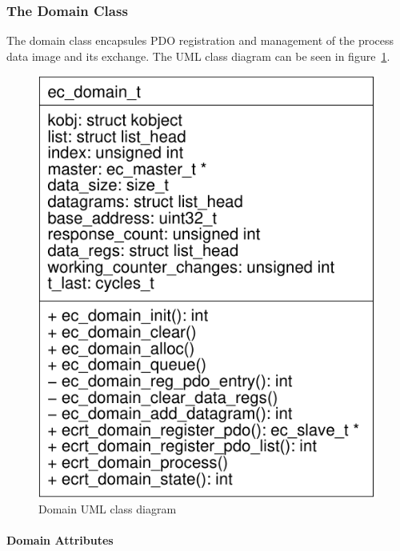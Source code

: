 \documentclass[a4paper,12pt,BCOR6mm,bibtotoc,idxtotoc]{scrbook}
\begin{document}

\subsubsection{The Domain Class}
\label{sec:class-domain}

The domain class encapsules PDO registration and management of the
process data image and its exchange. The UML class diagram can be seen
in figure~\ref{fig:uml-domain}.

\begin{figure}[htbp]
  \centering
  \includegraphics[width=.4\textwidth]{images/uml-domain}
  \caption{Domain UML class diagram}
  \label{fig:uml-domain}
\end{figure}

\paragraph{Domain Attributes}
\end{document}
